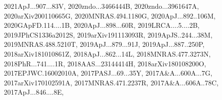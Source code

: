 \documentclass[12pt]{article}
\begin{document}
{2021ApJ...907...83V,%
2020zndo...3466444B,%
2020zndo...3961647A,%
2020arXiv200110665G,%
2020MNRAS.494.1180G,%
2020ApJ...892..106M,%
2020GApFD.114....1B,%
2020ApJ...898...60R,%
2019LRCA....5....2B,%
2019JPhCS1336a2012S,%
2019arXiv191113093R,%
2019ApJS..244...38M,%
2019MNRAS.488.5210T,%
2019ApJ...879...91J,%
2019ApJ...887..250P,%
2018arXiv181010861Z,%
2018ApJ...862...14L,%
2018MNRAS.477.3273N,%
2018PhR...741....1R,%
2018AAS...23144414H,%
2018arXiv180108200O,%
2017EPJWC.16002010A,%
2017PASJ...69...35Y,%
2017A&A...600A...7G,%
2017arXiv170102591A,%
2017MNRAS.471.2237R,%
2017A&A...606A..78C,%
2017ApJ...846....8E,%
}
\end{document}
